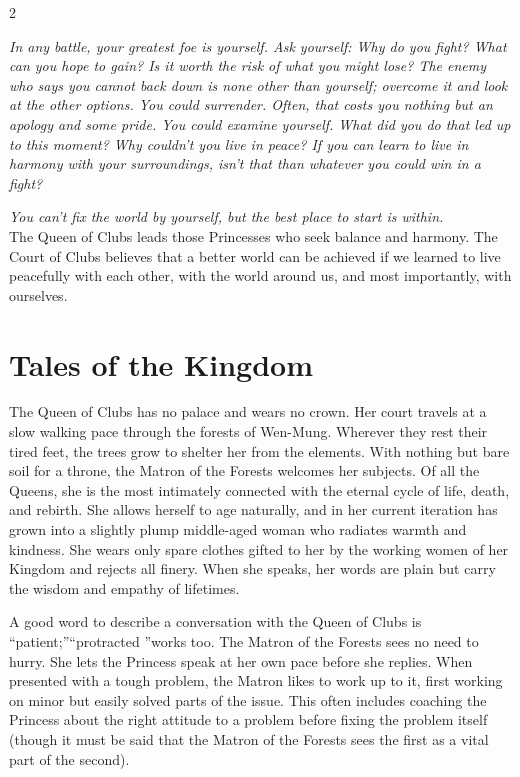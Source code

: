 \label{scha:Clubs}\begin{multicols}{2}\raggedcolumns

\noindent \textit{In any battle, your greatest foe is yourself. Ask yourself: Why do you fight? What can you hope to gain? Is it worth the risk of what you might lose? The enemy who says you cannot back down is none other than yourself; overcome it and look at the other options. You could surrender. Often, that costs you nothing but an apology and some pride. You could examine yourself. What did you do that led up to this moment? Why couldn't you live in peace? If you can learn to live in harmony with your surroundings, isn't that than whatever you could win in a fight?}

\textit{You can't fix the world by yourself, but the best place to start is within.}\\

\noindent The Queen of Clubs leads those Princesses who seek balance and harmony. The Court of Clubs believes that a better world can be achieved if we learned to live peacefully with each other, with the world around us, and most importantly, with ourselves. 

\section*{Tales of the Kingdom}
The Queen of Clubs has no palace and wears no crown. Her court travels at a slow walking pace through the forests of Wen-Mung. Wherever they rest their tired feet, the trees grow to shelter her from the elements. With nothing but bare soil for a throne, the Matron of the Forests welcomes her subjects. Of all the Queens, she is the most intimately connected with the eternal cycle of life, death, and rebirth. She allows herself to age naturally, and in her current iteration has grown into a slightly plump middle-aged woman who radiates warmth and kindness. She wears only spare clothes gifted to her by the working women of her Kingdom and rejects all finery. When she speaks, her words are plain but carry the wisdom and empathy of lifetimes.

A good word to describe a conversation with the Queen of Clubs is \textquotedblleft patient;\textquotedblright \textquotedblleft protracted \textquotedblright works too. The Matron of the Forests sees no need to hurry. She lets the Princess speak at her own pace before she replies. When presented with a tough problem, the Matron likes to work up to it, first working on minor but easily solved parts of the issue. This often includes coaching the Princess about the right attitude to a problem before fixing the problem itself (though it must be said that the Matron of the Forests sees the first as a vital part of the second).


\end{multicols}
